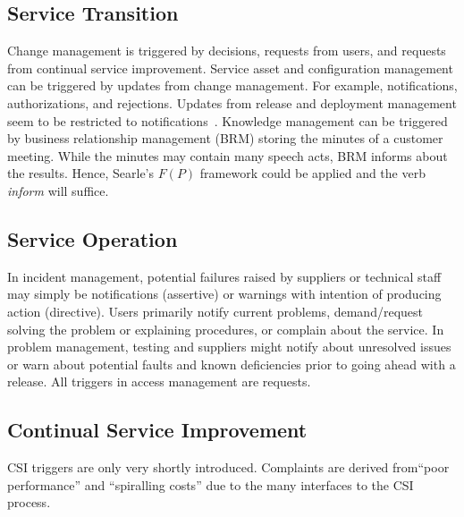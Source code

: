 \subsection{Service Transition~\cite{ITILServiceTransition}}
Change management is triggered by decisions, requests from users, and requests from continual service improvement.
%
Service asset and configuration management can be triggered by updates from change management.
For example, notifications, authorizations, and rejections.
Updates from release and deployment management
seem to be restricted to notifications~\cite[p. 147]{ITILServiceTransition}.
%
Knowledge management can be triggered by
business relationship management (BRM) storing the minutes of a customer meeting.
While the minutes may contain many speech acts,
BRM informs about the results.
Hence, Searle's $F(P)$ framework could be applied and the verb \emph{inform} will suffice.


\subsection{Service Operation~\cite{ITILServiceOperation}}
In incident management, potential failures raised by suppliers or technical staff
may simply be notifications (assertive) or warnings with intention of producing action (directive).
Users primarily notify current problems, demand/request solving the problem or explaining procedures, or complain about the service.
%
In problem management,
testing and suppliers might notify about unresolved issues
or warn about potential faults and known deficiencies
prior to going ahead with a release.
%
All triggers in access management are requests.

\subsection{Continual Service Improvement~\cite{ITILCSI}}
CSI triggers are only very shortly introduced.
Complaints are derived from``poor performance'' and ``spiralling costs''
due to the many interfaces to the CSI process.
